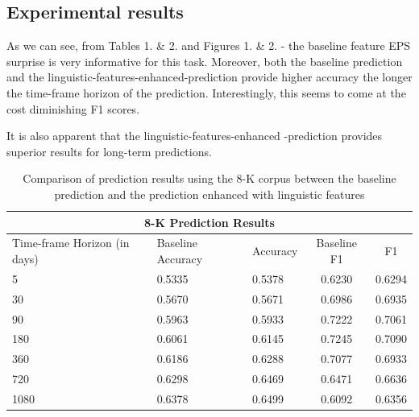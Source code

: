 \documentclass[11pt,a4paper]{article}
\begin{document}
\subsection{Experimental results}
As we can see, from Tables 1. \& 2. and Figures 1. \& 2. - the baseline feature EPS surprise is very informative for this task. Moreover, both the baseline prediction and the linguistic-features-enhanced-prediction provide higher accuracy the longer the time-frame horizon of the prediction. Interestingly, this seems to come at the cost diminishing F1 scores.

It is also apparent that the linguistic-features-enhanced -prediction provides superior results for long-term predictions. 
\begin{table}[h!]
\begin{tabular}{ |p{1.4cm}| p{1.5cm} p{1.2cm} c c|  }
 \hline
 \multicolumn{5}{|c|}{8-K Prediction Results} \\
 \hline
 Time-frame Horizon (in days)& Baseline Accuracy & Accuracy & Baseline F1 & F1\\
 \hline
5    & 0.5335 & 0.5378 & 0.6230 & 0.6294\\
30   & 0.5670 & 0.5671 & 0.6986 & 0.6935\\
90   & 0.5963 & 0.5933 & 0.7222 & 0.7061\\
180  & 0.6061 & 0.6145 & 0.7245 & 0.7090\\
360  & 0.6186 & 0.6288 & 0.7077 & 0.6933\\
720  & 0.6298 & 0.6469 & 0.6471 & 0.6636\\
1080 & 0.6378 & 0.6499 & 0.6092 & 0.6356\\
 \hline
\end{tabular}
\caption{Comparison of prediction results using the 8-K corpus between the baseline prediction and the prediction enhanced with linguistic features}
\label{table:1}
\end{table}
\end{document}
